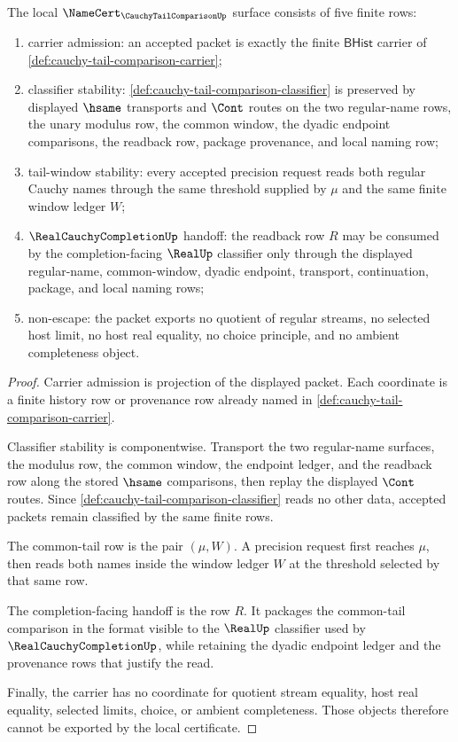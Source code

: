 \begin{theorem}
\label{thm:cauchy-tail-comparison-namecert-obligations}
The local $\NameCert_{\CauchyTailComparisonUp}$ surface consists of five finite rows:
\begin{enumerate}
\item carrier admission: an accepted packet is exactly the finite $\mathsf{BHist}$ carrier of \autoref{def:cauchy-tail-comparison-carrier};
\item classifier stability: \autoref{def:cauchy-tail-comparison-classifier} is preserved by displayed $\hsame$ transports and $\Cont$ routes on the two regular-name rows, the unary modulus row, the common window, the dyadic endpoint comparisons, the readback row, package provenance, and local naming row;
\item tail-window stability: every accepted precision request reads both regular Cauchy names through the same threshold supplied by $\mu$ and the same finite window ledger $W$;
\item $\RealCauchyCompletionUp$ handoff: the readback row $R$ may be consumed by the completion-facing $\RealUp$ classifier only through the displayed regular-name, common-window, dyadic endpoint, transport, continuation, package, and local naming rows;
\item non-escape: the packet exports no quotient of regular streams, no selected host limit, no host real equality, no choice principle, and no ambient completeness object.
\end{enumerate}
\end{theorem}
\begin{proof}
Carrier admission is projection of the displayed packet. Each coordinate is a finite history row or provenance row already named in \autoref{def:cauchy-tail-comparison-carrier}.

Classifier stability is componentwise. Transport the two regular-name surfaces, the modulus row, the common window, the endpoint ledger, and the readback row along the stored $\hsame$ comparisons, then replay the displayed $\Cont$ routes. Since \autoref{def:cauchy-tail-comparison-classifier} reads no other data, accepted packets remain classified by the same finite rows.

The common-tail row is the pair $(\mu,W)$. A precision request first reaches $\mu$, then reads both names inside the window ledger $W$ at the threshold selected by that same row.

The completion-facing handoff is the row $R$. It packages the common-tail comparison in the format visible to the $\RealUp$ classifier used by $\RealCauchyCompletionUp$, while retaining the dyadic endpoint ledger and the provenance rows that justify the read.

Finally, the carrier has no coordinate for quotient stream equality, host real equality, selected limits, choice, or ambient completeness. Those objects therefore cannot be exported by the local certificate.
\end{proof}

